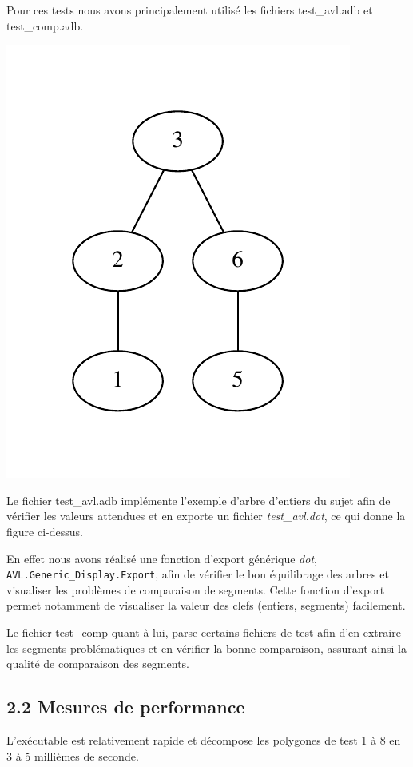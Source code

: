 \documentclass [a4paper,11pt] {report}
\begin{document}
Pour ces tests nous avons principalement utilisé les fichiers test\_avl.adb et test\_comp.adb.

\begin{center}
  \includegraphics[scale=0.75]{avl.pdf}
\end{center}

Le fichier test\_avl.adb implémente l'exemple d'arbre d'entiers du sujet afin de vérifier les valeurs attendues et en exporte un fichier \textit{test\_avl.dot}, ce qui donne la figure ci-dessus.


En effet nous avons réalisé une fonction d'export générique \textit{dot}, \lstinline!AVL.Generic_Display.Export!, afin de vérifier le bon équilibrage des arbres et visualiser les problèmes de comparaison de segments.
Cette fonction d'export permet notamment de visualiser la valeur des clefs (entiers, segments) facilement.


Le fichier test\_comp quant à lui, parse certains fichiers de test afin d'en extraire les segments problématiques et en vérifier la bonne comparaison, assurant ainsi la qualité de comparaison des segments.




\subsection* {2.2\hspace{3mm} Mesures de performance}

L'exécutable est relativement rapide et décompose les polygones de test 1 à 8 en 3 à 5 millièmes de seconde.
\end{document}
